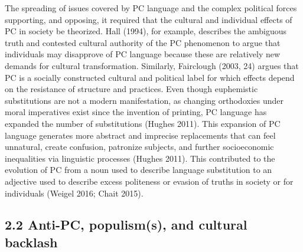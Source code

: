 \documentclass[
  12pt,
]{article}
\begin{document}
The spreading of issues covered by PC language and the complex political
forces supporting, and opposing, it required that the cultural and
individual effects of PC in society be theorized. Hall (1994), for
example, describes the ambiguous truth and contested cultural authority
of the PC phenomenon to argue that individuals may disapprove of PC
language because these are relatively new demands for cultural
transformation. Similarly, Fairclough (2003, 24) argues that PC is a
socially constructed cultural and political label for which effects
depend on the resistance of structure and practices. Even though
euphemistic substitutions are not a modern manifestation, as changing
orthodoxies under moral imperatives exist since the invention of
printing, PC language has expanded the number of substitutions (Hughes
2011). This expansion of PC language generates more abstract and
imprecise replacements that can feel unnatural, create confusion,
patronize subjects, and further socioeconomic inequalities via
linguistic processes (Hughes 2011). This contributed to the evolution of
PC from a noun used to describe language substitution to an adjective
used to describe excess politeness or evasion of truths in society or
for individuals (Weigel 2016; Chait 2015).

\hypertarget{anti-pc-populisms-and-cultural-backlash}{%
\subsection{2.2 Anti-PC, populism(s), and cultural
backlash}\label{anti-pc-populisms-and-cultural-backlash}}
\end{document}
